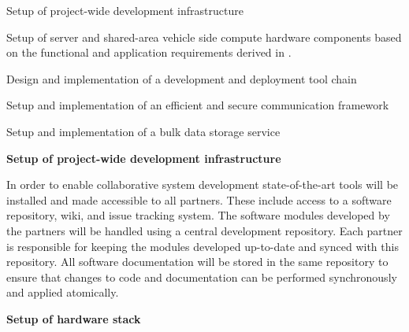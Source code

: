 {\begin{denseItemize}
\item Setup of project-wide development infrastructure
\item Setup of server and shared-area vehicle side compute hardware components based on the functional and application requirements derived in \WPSpecification.
\item Design and implementation of a development and deployment tool chain
\item Setup and implementation of an efficient and secure communication framework
\item Setup and implementation of a bulk data storage service
\end{denseItemize}


\begin{tasks}{\WPCloudNo}

\item {\bf Setup of project-wide development infrastructure}
\label{task:wpcloud:development-infrastructure}

In order to enable collaborative system development state-of-the-art tools will be installed and made accessible to all partners. These include access to a software repository, wiki, and issue tracking system. The software modules developed by the partners will be handled using a central
  development repository.
Each partner is responsible for keeping the modules
  developed up-to-date and synced with this repository.
All software documentation will be stored in the same repository
  to ensure that changes to code and documentation can be
  performed synchronously and applied atomically.


\item {\bf Setup of hardware stack}
\label{task:wpcloud:1}
\taskpartner{\IBM}


\end{tasks}}
